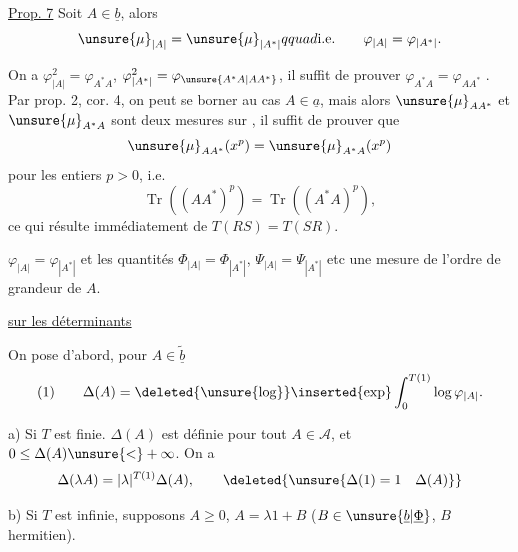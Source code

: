 \uline{Prop. 7} Soit $A\in\underline b$, alors
\margin{$\Big|$}
\[
\unsure{\mu}_{|A|}=\unsure{\mu}_{|A^*|}qquad\text{i.e.}\qquad
\varphi_{|A|}=\varphi_{|A^*|}.
\]

On a $\varphi_{|A|}^{2}=\varphi_{A^*A}$, $\varphi_{|A^*|}^{2}=\varphi_{\unsure{A^*A|AA^*}}$, il suffit de prouver $\varphi_{A^*A}=\varphi_{AA^*}$  . Par prop. 2, cor. 4, on peut se borner au cas $A\in\underline a$, mais alors  $\unsure{\mu}_{AA^*}$ et $\unsure{\mu}_{A^*A}$ sont deux mesures   sur \deleted{$[0,+\infty[$} , il suffit de prouver que
\[
\unsure{\mu}_{AA^*}(x^p)=\unsure{\mu}_{A^*A}(x^p)
\]
pour les entiers $p>0$, i.e.
\[
\operatorname{Tr}((AA^*)^p)=\operatorname{Tr}((A^*A)^p),
\]
ce qui résulte immédiatement de $T(RS)=T(SR)$.

$\varphi_{|A|}=\varphi_{|A^*|}$ et les quantités 
$\Phi_{|A|}=\Phi_{|A^*|}$, $\Psi_{|A|}=\Psi_{|A^*|}$ etc     une mesure de l'ordre de grandeur de $A$.

\quad\uline{ sur les déterminants}

 On pose  d'abord, pour $A\in\widetilde{\underline b}$
\[
(1)\qquad\Delta(A)=\deleted{\unsure{\log}}\inserted{\exp}\int_0^{T(1)}\log\varphi_{|A|}.
\]
  

a) Si $T$ est finie. $\Delta(A)$ est définie pour tout $A\in\mathcal A$, et $0\leq\Delta(A)\unsure{<}+\infty$. On a
\[
\Delta(\lambda A)=|\lambda|^{T(1)}\Delta(A),
\qquad\deleted{\unsure{\Delta(1)=1\quad\Delta(A)}}
\]

b) Si $T$ est infinie, supposons $A\geq0$, $A=\lambda1+B$ ($B\in\unsure{\underline b|\underline\Phi}$, $B$ hermitien). 
